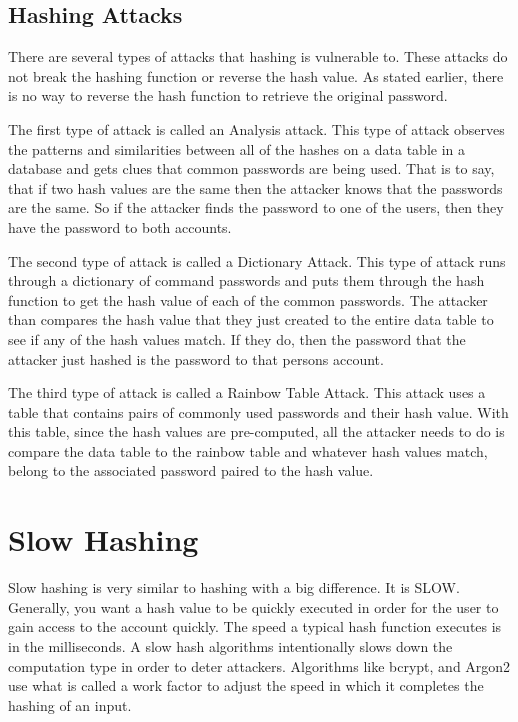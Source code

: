 \documentclass[12pt]{article}
\begin{document}
\subsection{\indent Hashing Attacks}
There are several types of attacks that hashing is vulnerable to. These attacks do not break the hashing function or reverse the hash value. As stated earlier, there is no way to reverse the hash function to retrieve the original password. 

The first type of attack is called an Analysis attack. This type of attack observes the patterns and similarities between all of the hashes on a data table in a database and gets clues that common passwords are being used. That is to say, that if two hash values are the same then the attacker knows that the passwords are the same. So if the attacker finds the password to one of the users, then they have the password to both accounts. 

The second type of attack is called a Dictionary Attack. This type of attack runs through a dictionary of command passwords and puts them through the hash function to get the hash value of each of the common passwords. The attacker than compares the hash value that they just created to the entire data table to see if any of the hash values match. If they do, then the password that the attacker just hashed is the password to that persons account. 

The third type of attack is called a Rainbow Table Attack. This attack uses a table that contains pairs of commonly used passwords and their hash value. With this table, since the hash values are pre-computed, all the attacker needs to do is compare the data table to the rainbow table and whatever hash values match, belong to the associated password paired to the hash value. 

\section{Slow Hashing}
Slow hashing is very similar to hashing with a big difference. It is SLOW. Generally, you want a hash value to be quickly executed in order for the user to gain access to the account quickly. The speed a typical hash function executes is in the milliseconds. 
A slow hash algorithms intentionally slows down the computation type in order to deter attackers. Algorithms like bcrypt, and Argon2 use what is called a work factor to adjust the speed in which it completes the hashing of an input. 
\end{document}
